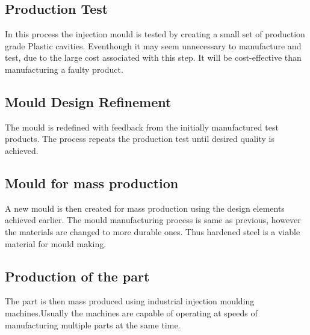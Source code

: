 \documentclass[12pt,a4paper,oneside]{article}
\begin{document}
\subsection{Production Test}

In this process the injection mould is tested by creating a small set of production grade Plastic cavities. Eventhough it may seem unnecessary to manufacture and test, due to the large cost associated with this step. It will be cost-effective than manufacturing a faulty product.

\subsection{Mould Design Refinement}

The mould is redefined with feedback from the initially manufactured test products. The process repeats the production test until desired quality is achieved.

\subsection{Mould for mass production}

A new mould is then created for mass production using the design elements achieved earlier. The mould manufacturing process is same as previous, however the materials are changed to more durable ones. Thus hardened steel is a viable material for mould making. 
\cite{2018:Injection}


\subsection{Production of the part}

The part is then mass produced using industrial injection moulding machines.Usually the machines are capable of operating at speeds of manufacturing multiple parts at the same time.  


\clearpage
{}
\printbibliography
\end{document}
